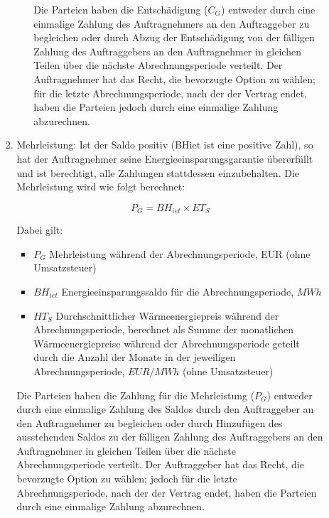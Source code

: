 \begin{enumerate}
\begin{enumerate}
\begin{enumerate}
\begin{enumerate}
\vspace{1cm}

Die Parteien haben die Entschädigung ($C_G$) entweder durch eine einmalige Zahlung des Auftragnehmers an den Auftraggeber zu begleichen oder durch Abzug der Entschädigung von der fälligen Zahlung des Auftraggebers an den Auftragnehmer in gleichen Teilen über die nächste Abrechnungsperiode verteilt. Der Auftragnehmer hat das Recht, die bevorzugte Option zu wählen; für die letzte Abrechnungsperiode, nach der der Vertrag endet, haben die Parteien jedoch durch eine einmalige Zahlung abzurechnen.

\end{enumerate}

\item Mehrleistung: Ist der Saldo positiv (BHiet ist eine positive Zahl), so hat der Auftragnehmer seine Energieeinsparungsgarantie übererfüllt und ist berechtigt, alle Zahlungen stattdessen einzubehalten. Die Mehrleistung wird wie folgt berechnet:

  \[ P_G = BH_{iet} \times ET_S \]

Dabei gilt:

\begin{itemize}[label={}]
	\item $P_G$ \quad \quad Mehrleistung während der Abrechnungsperiode, EUR (ohne Umsatzsteuer)
	\item $BH_{iet}$ \quad Energieeinsparungssaldo für die Abrechnungsperiode, $MWh$
	\item $HT_S$ \quad Durchschnittlicher Wärmeenergiepreis während der Abrechnungsperiode, berechnet als Summe der monatlichen Wärmeenergiepreise während der Abrechnungsperiode geteilt durch die Anzahl der Monate in der jeweiligen Abrechnungsperiode, $EUR/MWh$ (ohne Umsatzsteuer)
\end{itemize}

\vspace{1cm}

Die Parteien haben die Zahlung für die Mehrleistung ($P_G$) entweder durch eine einmalige Zahlung des Saldos durch den Auftraggeber an den Auftragnehmer zu begleichen oder durch Hinzufügen des ausstehenden Saldos zu der fälligen Zahlung des Auftraggebers an den Auftragnehmer in gleichen Teilen über die nächste Abrechnungsperiode verteilt. Der Auftraggeber hat das Recht, die bevorzugte Option zu wählen; jedoch für die letzte Abrechnungsperiode, nach der der Vertrag endet, haben die Parteien durch eine einmalige Zahlung abzurechnen.

  \end{enumerate}


\end{enumerate}
\end{enumerate}
